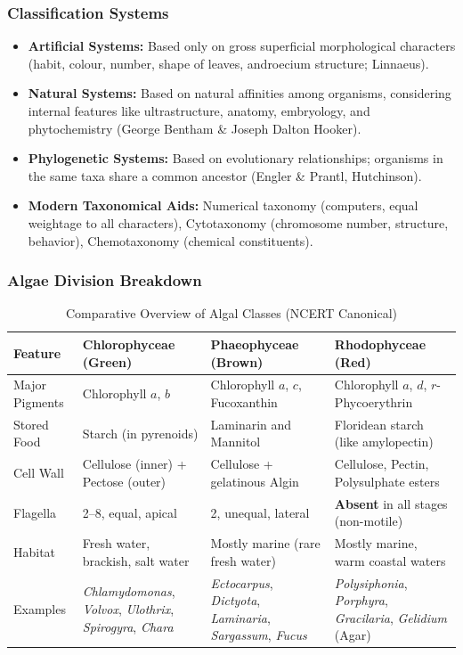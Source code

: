 \documentclass[11pt,a4paper]{article}
\begin{document}
\subsubsection{Classification Systems}
\begin{itemize}[leftmargin=1.5em, itemsep=2pt]
  \item \textbf{Artificial Systems:} Based only on gross superficial morphological characters (habit, colour, number, shape of leaves, androecium structure; Linnaeus).
  \item \textbf{Natural Systems:} Based on natural affinities among organisms, considering internal features like ultrastructure, anatomy, embryology, and phytochemistry (George Bentham \& Joseph Dalton Hooker).
  \item \textbf{Phylogenetic Systems:} Based on evolutionary relationships; organisms in the same taxa share a common ancestor (Engler \& Prantl, Hutchinson).
  \item \textbf{Modern Taxonomical Aids:} Numerical taxonomy (computers, equal weightage to all characters), Cytotaxonomy (chromosome number, structure, behavior), Chemotaxonomy (chemical constituents).
\end{itemize}

\subsubsection{Algae Division Breakdown}
\begin{table}[h]
\centering
\small
\begin{tabularx}{\textwidth}{l X X X}
\toprule
\textbf{Feature} & \textbf{Chlorophyceae (Green)} & \textbf{Phaeophyceae (Brown)} & \textbf{Rhodophyceae (Red)} \\
\midrule
Major Pigments & Chlorophyll $a$, $b$ & Chlorophyll $a$, $c$, Fucoxanthin & Chlorophyll $a$, $d$, $r$-Phycoerythrin \\
Stored Food & Starch (in pyrenoids) & Laminarin and Mannitol & Floridean starch (like amylopectin) \\
Cell Wall & Cellulose (inner) + Pectose (outer) & Cellulose + gelatinous Algin & Cellulose, Pectin, Polysulphate esters \\
Flagella & 2--8, equal, apical & 2, unequal, lateral & \textbf{Absent} in all stages (non-motile) \\
Habitat & Fresh water, brackish, salt water & Mostly marine (rare fresh water) & Mostly marine, warm coastal waters \\
Examples & \textit{Chlamydomonas}, \textit{Volvox}, \textit{Ulothrix}, \textit{Spirogyra}, \textit{Chara} & \textit{Ectocarpus}, \textit{Dictyota}, \textit{Laminaria}, \textit{Sargassum}, \textit{Fucus} & \textit{Polysiphonia}, \textit{Porphyra}, \textit{Gracilaria}, \textit{Gelidium} (Agar) \\
\bottomrule
\end{tabularx}
\caption{Comparative Overview of Algal Classes (NCERT Canonical)}
\end{table}
\end{document}
